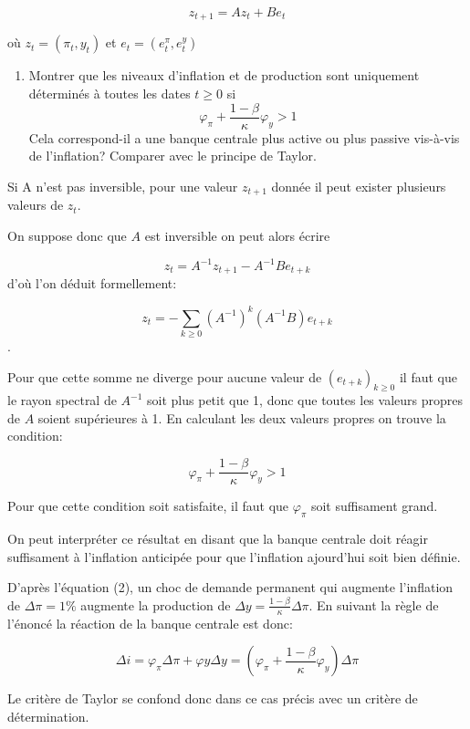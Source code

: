 \documentclass[
  letterpaper,
  DIV=11,
  numbers=noendperiod]{scrartcl}
\providecommand{\tightlist}{%
  \setlength{\itemsep}{0pt}\setlength{\parskip}{0pt}}\usepackage{longtable,booktabs,array}
\begin{document}
\[z_{t+1} = A z_t + B e_t\]

où \(z_t=(\pi_t, y_t)\) et \(e_t = (e^{\pi}_t, e^{y}_t)\)

\begin{enumerate}
\def\labelenumi{\arabic{enumi}.}
\setcounter{enumi}{1}
\tightlist
\item
  Montrer que les niveaux d'inflation et de production sont uniquement
  déterminés à toutes les dates \(t\geq 0\) si
  \[\varphi_{\pi} + \frac{1-\beta}{\kappa} \varphi_{y}> 1\] Cela
  correspond-il a une banque centrale plus active ou plus passive
  vis-à-vis de l'inflation? Comparer avec le principe de Taylor.
\end{enumerate}

\begin{tcolorbox}[enhanced jigsaw, colbacktitle=quarto-callout-warning-color!10!white, rightrule=.15mm, left=2mm, leftrule=.75mm, colframe=quarto-callout-warning-color-frame, titlerule=0mm, colback=white, toptitle=1mm, bottomtitle=1mm, breakable, coltitle=black, title=\textcolor{quarto-callout-warning-color}{\faExclamationTriangle}\hspace{0.5em}{Correction}, bottomrule=.15mm, opacityback=0, arc=.35mm, toprule=.15mm, opacitybacktitle=0.6]

Si A n'est pas inversible, pour une valeur \(z_{t+1}\) donnée il peut
exister plusieurs valeurs de \(z_t\).

On suppose donc que \(A\) est inversible on peut alors écrire

\[z_t = A^{-1} z_{t+1} -  A^{-1} B e_{t+k}\] d'où l'on déduit
formellement:

\[z_t = -\sum_{k \geq 0} \left(A^{-1}\right)^k (A^{-1} B) e_{t+k}\].

Pour que cette somme ne diverge pour aucune valeur de
\((e_{t+k})_{k\geq0}\) il faut que le rayon spectral de \(A^{-1}\) soit
plus petit que 1, donc que toutes les valeurs propres de \(A\) soient
supérieures à 1. En calculant les deux valeurs propres on trouve la
condition:

\[\varphi_{\pi} + \frac{1-\beta}{\kappa} \varphi_{y}> 1\]

Pour que cette condition soit satisfaite, il faut que \(\varphi_{\pi}\)
soit suffisament grand.

On peut interpréter ce résultat en disant que la banque centrale doit
réagir suffisament à l'inflation anticipée pour que l'inflation
ajourd'hui soit bien définie.

D'après l'équation (2), un choc de demande permanent qui augmente
l'inflation de \(\Delta \pi=1\%\) augmente la production de
\(\Delta y=\frac{1-\beta}{\kappa}\Delta \pi\). En suivant la règle de
l'énoncé la réaction de la banque centrale est donc:

\[\Delta i = \varphi_{\pi} \Delta \pi + \varphi{y} \Delta y = \left( \varphi_{\pi}  +\frac{1-\beta}{\kappa}  \varphi_y \right)\Delta \pi\]

Le critère de Taylor se confond donc dans ce cas précis avec un critère
de détermination.

\end{tcolorbox}
\end{document}
